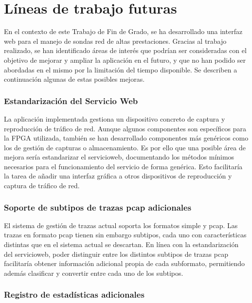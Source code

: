 \chapter{Líneas de trabajo futuras\label{cap:lineas_de_trabajo_futuras}}

En el contexto de este Trabajo de Fin de Grado, se ha desarrollado una interfaz web para el manejo de sondas red de altas prestaciones. Gracias al trabajo realizado, se han identificado áreas de interés que podrían ser consideradas con el objetivo de mejorar y ampliar la aplicación en el futuro, y que no han podido ser abordadas en el mismo por la limitación del tiempo disponible. Se describen a continuación algunas de estas posibles mejoras.

\subsection*{Estandarización del Servicio Web}

La aplicación implementada gestiona un dispositivo concreto de captura y reproducción de tráfico de red. Aunque algunos componentes son específicos para la \gls{FPGA} utilizada, también se han desarrollado componentes más genéricos como los de gestión de capturas o almacenamiento. Es por ello que una posible área de mejora sería estandarizar el \gls{servicioweb}, documentando los métodos mínimos necesarios para el funcionamiento del servicio de forma genérica. Esto facilitaría la tarea de añadir una interfaz gráfica a otros dispositivos de reproducción y captura de tráfico de red.


\subsection*{Soporte de subtipos de trazas pcap adicionales}

El sistema de gestión de \glspl{traza} actual soporta los formatos \gls{simple} y \gls{pcap}. Las \glspl{traza} en formato \gls{pcap} tienen sin embargo subtipos, cada uno con características distintas que en el sistema actual se descartan. En línea con la estandarización del \gls{servicioweb}, poder distinguir entre los distintos subtipos de \glspl{traza} \gls{pcap} facilitaría obtener información adicional propia de cada subformato, permitiendo además clasificar y convertir entre cada uno de los subtipos.


\subsection*{Registro de estadísticas adicionales}

